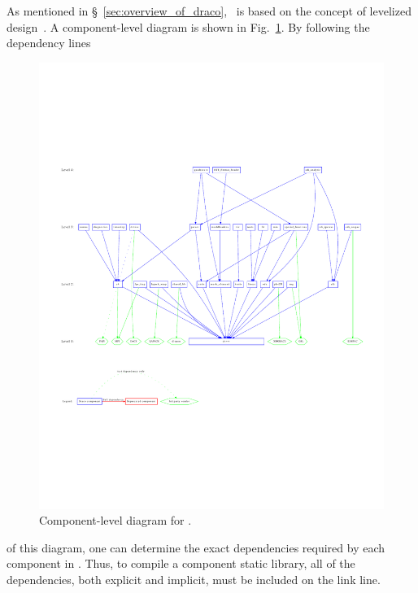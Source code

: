 As mentioned in \S~\ref{sec:overview_of_draco}, \draco\ is based on
the concept of levelized design~\cite{la96}.  A component-level diagram
is shown in Fig.~\ref{fig:level}.  By following the dependency lines
\begin{figure}
  \centerline{\includegraphics[angle=90]{fig/level}}
  \caption{Component-level diagram for \draco.}
  \label{fig:level}
\end{figure}
of this diagram, one can determine the exact dependencies required by
each component in \draco.  Thus, to compile a component static library, all of
the dependencies, both explicit and implicit, must be included on the
link line.


